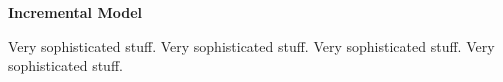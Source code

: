 \begin{center} \textbf{\huge Incremental Model} \end{center}
Very sophisticated stuff. Very sophisticated stuff. Very sophisticated stuff. Very sophisticated stuff.
